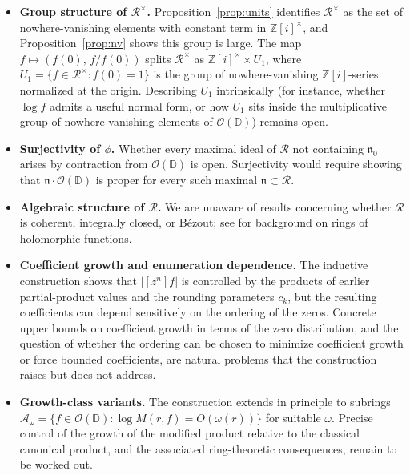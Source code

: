 \documentclass{amsart}
\theoremstyle{definition}
\newcommand{\D}{\mathbb{D}}
\newcommand{\Zi}{\mathbb{Z}[i]}
\newcommand{\abs}[1]{\left|#1\right|}
\newcommand{\OD}{\mathcal{O}(\D)}
\newcommand{\mR}{\mathcal{R}}
\begin{document}
\begin{itemize}
\item \textbf{Group structure of $\mR^\times$.}
  Proposition~\ref{prop:units} identifies $\mR^\times$ as the set of
  nowhere-vanishing elements with constant term in $\Zi^\times$, and
  Proposition~\ref{prop:nv} shows this group is large.  The map
  $f \mapsto (f(0),\, f/f(0))$ splits $\mR^\times$ as
  $\Zi^\times \times U_1$, where $U_1 = \{f \in \mR^\times : f(0) = 1\}$
  is the group of nowhere-vanishing $\Zi$-series normalized at the
  origin.  Describing $U_1$ intrinsically (for instance, whether
  $\log f$ admits a useful normal form, or how $U_1$ sits inside the
  multiplicative group of nowhere-vanishing elements of $\OD$) remains
  open.

\item \textbf{Surjectivity of $\phi$.}  Whether every maximal ideal of
  $\mR$ not containing $\mathfrak{n}_0$ arises by contraction from
  $\OD$ is open.  Surjectivity would require showing that
  $\mathfrak{n}\cdot\OD$ is proper for every such maximal
  $\mathfrak{n} \subset \mR$.

\item \textbf{Algebraic structure of $\mR$.}  We are unaware of results
  concerning whether $\mR$ is coherent, integrally closed, or B\'ezout;
  see \cite{Stout} for background on rings of holomorphic functions.

\item \textbf{Coefficient growth and enumeration dependence.}
  The inductive construction shows that $\abs{[z^n]f}$ is controlled
  by the products of earlier partial-product values and the rounding
  parameters $c_k$, but the resulting coefficients can depend
  sensitively on the ordering of the zeros.  Concrete upper bounds on
  coefficient growth in terms of the zero distribution, and the
  question of whether the ordering can be chosen to minimize coefficient
  growth or force bounded coefficients, are natural problems that the
  construction raises but does not address.

\item \textbf{Growth-class variants.}  The construction extends in
  principle to subrings $\mathcal{A}_\omega = \{f \in \OD :
  \log M(r,f) = O(\omega(r))\}$ for suitable $\omega$.  Precise
  control of the growth of the modified product relative to the
  classical canonical product, and the associated ring-theoretic
  consequences, remain to be worked out.
\end{itemize}
\end{document}
